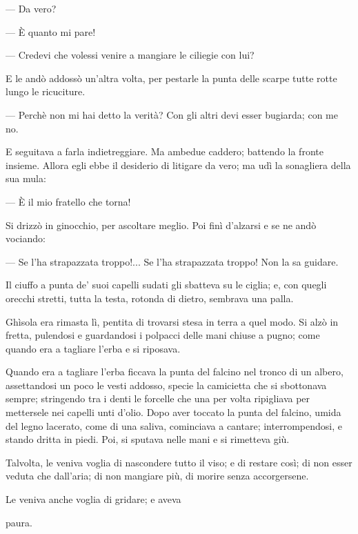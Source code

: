 — Da vero?

— È quanto mi pare!

— Credevi che volessi venire a mangiare le ciliegie con lui?

E le andò addossò un’altra volta, per pestarle la punta delle scarpe tutte rotte lungo le ricuciture.

— Perchè non mi hai detto la verità? Con gli altri devi esser bugiarda; con me no.

E seguitava a farla indietreggiare. Ma ambedue caddero; battendo la fronte insieme. Allora egli ebbe il desiderio di litigare da vero; ma udì la sonagliera della sua mula:

— È il mio fratello che torna!

Si drizzò in ginocchio, per ascoltare meglio. Poi finì d'alzarsi e se ne andò vociando:

— Se l'ha strapazzata troppo!... Se l'ha strapazzata troppo! Non la sa guidare.

Il ciuffo a punta de' suoi capelli sudati gli sbatteva su le ciglia; e, con quegli orecchi stretti, tutta la testa, rotonda di dietro, sembrava una palla.

Ghìsola era rimasta lì, pentita di trovarsi stesa in terra a quel modo. Si alzò in fretta, pulendosi e guardandosi i polpacci delle mani chiuse a pugno; come quando era a tagliare l'erba e si riposava.

Quando era a tagliare l'erba ficcava la punta del falcino nel tronco di un albero, assettandosi un poco le vesti addosso, specie la camicietta che si sbottonava sempre; stringendo tra i denti le forcelle che una per volta ripigliava per mettersele nei capelli unti d'olio. Dopo aver toccato la punta del falcino, umida del legno lacerato, come di una saliva, cominciava a cantare; interrompendosi, e stando dritta in piedi. Poi, si sputava nelle mani e si rimetteva giù.

Talvolta, le veniva voglia di nascondere tutto il viso; e di restare così; di non esser veduta che dall'aria; di non mangiare più, di morire senza accorgersene.

Le veniva anche voglia di gridare; e aveva

paura.
